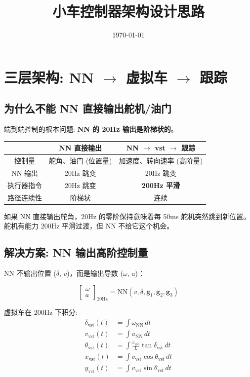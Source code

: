 \documentclass[11pt,a4paper]{article}
\title{小车控制器架构设计思路}
\author{}
\date{\today}
\begin{document}
\maketitle

\section{三层架构: NN $\to$ 虚拟车 $\to$ 跟踪}

\subsection{为什么不能 NN 直接输出舵机/油门}

端到端控制的根本问题: \textbf{NN 的 20Hz 输出是阶梯状的}。

\begin{center}
\begin{tabular}{c|c|c}
\toprule
& NN 直接输出 & NN $\to$ vst $\to$ 跟踪 \\
\midrule
控制量 & 舵角、油门 (位置量) & 加速度、转向速率 (高阶量) \\
NN 输出 & 20Hz 跳变 & 20Hz 跳变 \\
执行器指令 & 20Hz 跳变 & \textbf{200Hz 平滑} \\
路径连续性 & 阶梯状 & 连续 \\
\bottomrule
\end{tabular}
\end{center}

如果 NN 直接输出舵角，20Hz 的零阶保持意味着每 50ms 舵机突然跳到新位置。舵机有能力 200Hz 平滑过渡，但 NN 不给它这个机会。

\subsection{解决方案: NN 输出高阶控制量}

NN 不输出位置 ($\delta$, $v$)，而是输出导数 ($\omega$, $a$)：

\begin{equation}
\begin{bmatrix} \omega \\ a \end{bmatrix}_{\text{20Hz}} = \text{NN}(v, \delta, \mathbf{g}_1, \mathbf{g}_2, \mathbf{g}_3)
\end{equation}

虚拟车在 200Hz 下积分:
\begin{align}
\delta_{\text{vst}}(t) &= \int \omega_{\text{NN}} \,dt \\
v_{\text{vst}}(t)     &= \int a_{\text{NN}} \,dt \\
\theta_{\text{vst}}(t) &= \int \frac{v_{\text{vst}}}{L}\tan\delta_{\text{vst}} \,dt \\
x_{\text{vst}}(t)     &= \int v_{\text{vst}}\cos\theta_{\text{vst}} \,dt \\
y_{\text{vst}}(t)     &= \int v_{\text{vst}}\sin\theta_{\text{vst}} \,dt
\end{align}
\end{document}
